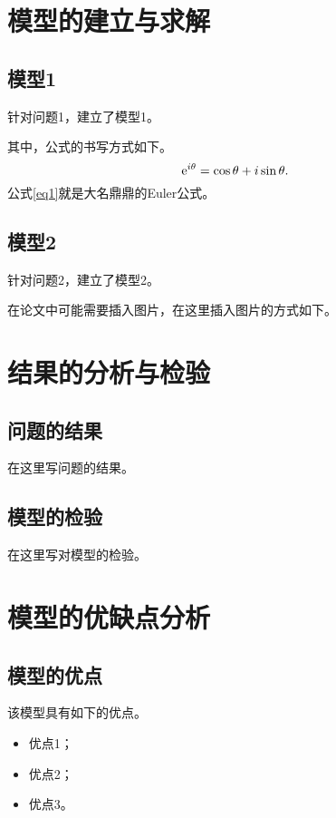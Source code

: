 \documentclass[12pt, a4paper, oneside]{ctexart}
\begin{document}
\section{模型的建立与求解}

\subsection{模型1}

针对问题1，建立了模型1。

其中，公式的书写方式如下。
\begin{equation}
    \label{eq1}
    {\rm{e}}^{i\theta}=\cos\theta+i\sin\theta.
\end{equation}
公式\ref{eq1}就是大名鼎鼎的Euler公式。

\subsection{模型2}

针对问题2，建立了模型2。

在论文中可能需要插入图片，在这里插入图片的方式如下。

\section{结果的分析与检验}

\subsection{问题的结果}

在这里写问题的结果。

\subsection{模型的检验}

在这里写对模型的检验。

\section{模型的优缺点分析}

\subsection{模型的优点}

该模型具有如下的优点。
\begin{itemize}
    \item 优点1；
    \item 优点2；
    \item 优点3。
\end{itemize}
\end{document}
